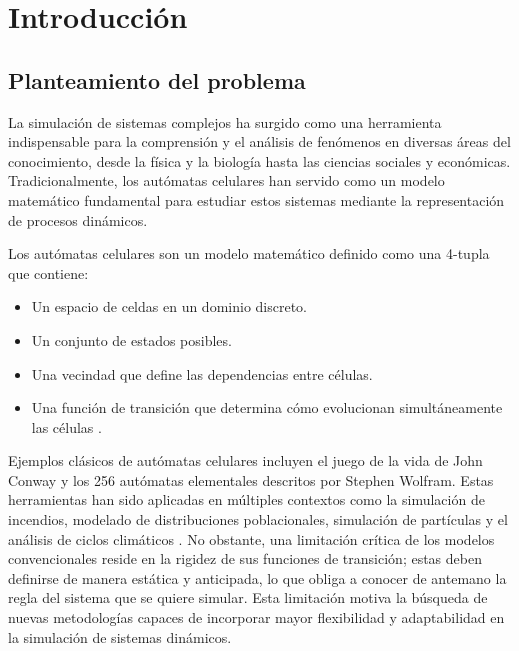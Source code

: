 \chapter{Introducción}

\section{Planteamiento del problema}

La simulación de sistemas complejos ha surgido como una herramienta indispensable para la comprensión y el análisis de fenómenos en diversas áreas del conocimiento, desde la física y la biología hasta las ciencias sociales y económicas. Tradicionalmente, los autómatas celulares han servido como un modelo matemático fundamental para estudiar estos sistemas mediante la representación de procesos dinámicos. 

Los autómatas celulares son un modelo matemático definido como una 4-tupla que contiene: 

\begin{itemize}
	
	\item Un espacio de celdas en un dominio discreto.
	
	\item Un conjunto de estados posibles.
	
	\item Una vecindad que define las dependencias entre células.
	
	\item Una función de transición que determina cómo evolucionan simultáneamente las células \cite{weisstein2002_ca, ZenilMartinez2024}. 
	
\end{itemize}

Ejemplos clásicos de autómatas celulares incluyen el juego de la vida de John Conway y los 256 autómatas elementales descritos por Stephen Wolfram. Estas herramientas han sido aplicadas en múltiples contextos como la simulación de incendios, modelado de distribuciones poblacionales, simulación de partículas y el análisis de ciclos climáticos \cite{darg}. No obstante, una limitación crítica de los modelos convencionales reside en la rigidez de sus funciones de transición; estas deben definirse de manera estática y anticipada, lo que obliga a conocer de antemano la regla del sistema que se quiere simular. Esta limitación motiva la búsqueda de nuevas metodologías capaces de incorporar mayor flexibilidad y adaptabilidad en la simulación de sistemas dinámicos. 

